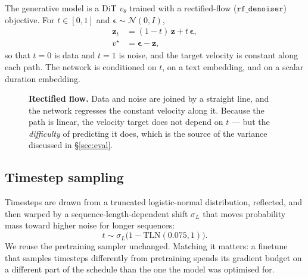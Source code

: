 \documentclass[10pt,twocolumn,letterpaper]{article}
\newcommand{\bz}{\mathbf{z}}
\newcommand{\bef}{\boldsymbol{\epsilon}}
\begin{document}
The generative model is a DiT $v_\theta$ trained with a rectified-flow ($\texttt{rf\_denoiser}$)
objective. For $t \in [0,1]$ and $\bef \sim \mathcal{N}(0, I)$,
\begin{align}
\bz_t &= (1-t)\,\bz + t\,\bef, \label{eq:path}\\
v^\star &= \bef - \bz, \label{eq:target}
\end{align}
so that $t{=}0$ is data and $t{=}1$ is noise, and the target velocity is constant along
each path. The network is conditioned on $t$, on a text embedding, and on a scalar
duration embedding.

\begin{figure}[t]
\centering
{}
\caption{\textbf{Rectified flow.} Data and noise are joined by a straight line, and the
network regresses the constant velocity along it. Because the path is linear, the
velocity target does not depend on $t$ --- but the \emph{difficulty} of predicting it
does, which is the source of the variance discussed in \S\ref{sec:eval}.}
\label{fig:rf}
\end{figure}

\subsection{Timestep sampling}

Timesteps are drawn from a truncated logistic-normal distribution, reflected, and then
warped by a sequence-length-dependent shift $\sigma_L$ that moves probability mass toward
higher noise for longer sequences:
\begin{equation}
t \sim \sigma_L\big(1 - \mathrm{TLN}(0.075, 1)\big).
\end{equation}
We reuse the pretraining sampler unchanged. Matching it matters: a finetune that samples
timesteps differently from pretraining spends its gradient budget on a different part of
the schedule than the one the model was optimised for.
\end{document}
